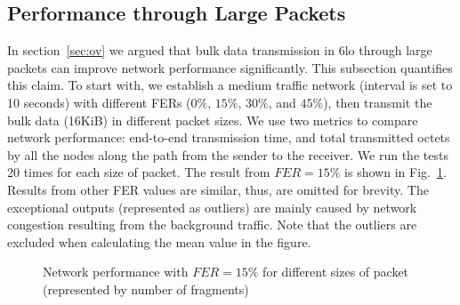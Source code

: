 \documentclass[runningheads,a4paper]{llncs}
\begin{document}
\subsection{Performance through Large Packets} \label{sec:vd}
In section~\ref{sec:ov} we argued that bulk data transmission in 6lo through large packets can improve network performance significantly. This subsection quantifies this claim. To start with, we establish a medium traffic network (interval is set to 10 seconds) with different FERs ($0\%$, $15\%$, $30\%$, and $45\%$), then transmit the bulk data (16KiB) in different packet sizes. We use two metrics to compare network performance: end-to-end transmission time, and total transmitted octets by all the nodes along the path from the sender to the receiver. We run the tests 20 times for each size of packet. The result from $FER=15\%$ is shown in Fig.~\ref{fig:vd}. Results from other FER values are similar, thus, are omitted for brevity. The exceptional outputs (represented as outliers) are mainly caused by network congestion resulting from the background traffic. Note that the outliers are excluded when calculating the mean value in the figure.
\begin{figure}
	\vspace{-10pt}
	\centering
	\caption{Network performance with $FER=15\%$  for different sizes of packet (represented by number of fragments)}
	\label{fig:vd}
	\vspace{-10pt}
\end{figure}
\end{document}

